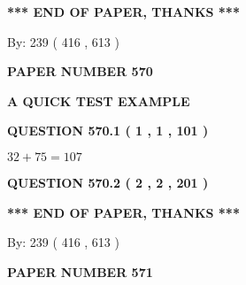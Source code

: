 \documentclass[12pt]{article}
\begin{document}
   
   
\vspace{1.0in} 
{\textbf{\large{ *** END OF PAPER, THANKS *** }}} 
   
   
\hspace{1.0in} By: 
 239 ( 416 ,  613 )
   
   
   
   
\newpage 
\setcounter{page}{ 
   570001 } 
   
   
   
   
 {\textbf{ \Large{ PAPER NUMBER  570  }}}
   
   
\vspace{0.2in}
   
   
   
   
   
   
 \vspace{0.2in}
{\LARGE {\textbf{ A QUICK TEST EXAMPLE}}}
   
   
  
\vspace{0.2in}
  
{\textbf{\Large{QUESTION
570.1 
 ( 1 , 1 , 101 )
}}}
  
  
 
 

$ %
32 +  %
75=   %
107$
 
 
  
\vspace{0.2in}
  
{\textbf{\Large{QUESTION
570.2 
 ( 2 , 2 , 201 )
}}}
  
  
   
   
 \vspace{0.2in}
 
   
   
   
   
\vspace{1.0in} 
{\textbf{\large{ *** END OF PAPER, THANKS *** }}} 
   
   
\hspace{1.0in} By: 
 239 ( 416 ,  613 )
   
   
   
   
\newpage 
\setcounter{page}{ 
   571001 } 
   
   
   
   
 {\textbf{ \Large{ PAPER NUMBER  571  }}}
   
   
\vspace{0.2in}
   
\end{document}
